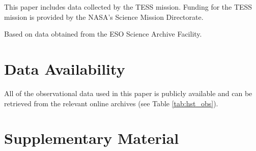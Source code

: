 \documentclass[fleqn,usenatbib]{mnras}
\begin{document}
This paper includes data collected by the TESS mission. Funding for the TESS mission is provided by the NASA's Science Mission Directorate.

Based on data obtained from the ESO Science Archive Facility.

\section{Data Availability}
All of the observational data used in this paper is publicly available and can be retrieved from the relevant online archives (see Table \ref{tab:hst_obs}).










\appendix
\section{Supplementary Material}
\end{document}
